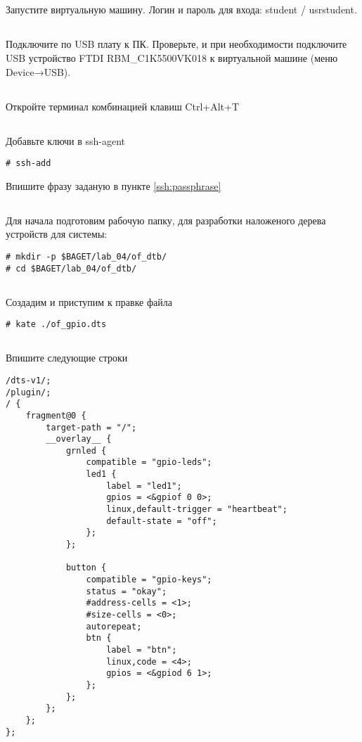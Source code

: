 \subsection{}Запустите виртуальную машину. Логин и пароль для входа: student / usrstudent.

\subsection{}Подключите по USB плату к ПК. Проверьте, и при необходимости подключите USB устройство FTDI RBM\_C1K5500VK018 к виртуальной машине (меню Device→USB).

\subsection{}Откройте терминал комбинацией клавиш Ctrl+Alt+T

\subsection{}Добавьте ключи в ssh-agent
\begin{lstlisting}[style=bash]
	# ssh-add
\end{lstlisting}
Впишите фразу заданую в пункте \ref{ssh:passphrase}

\subsection{}Для начала подготовим рабочую папку, для разработки наложеного дерева устройств для системы: 
\begin{lstlisting}[style=bash]
# mkdir -p $BAGET/lab_04/of_dtb/
# cd $BAGET/lab_04/of_dtb/
\end{lstlisting}

\subsection{}Создадим и приступим к правке файла 
\begin{lstlisting}[style=bash]
# kate ./of_gpio.dts
\end{lstlisting}

\subsection{}Впишите следующие строки
\begin{lstlisting}[style=stdout]
/dts-v1/;
/plugin/;
/ {
	fragment@0 {
		target-path = "/";
		__overlay__ {
			grnled {
				compatible = "gpio-leds";
				led1 {
					label = "led1";
					gpios = <&gpiof 0 0>;
					linux,default-trigger = "heartbeat";
					default-state = "off";
				};
			};
			
			button {
				compatible = "gpio-keys";
				status = "okay";
				#address-cells = <1>;
				#size-cells = <0>;
				autorepeat;
				btn {
					label = "btn";
					linux,code = <4>;
					gpios = <&gpiod 6 1>;
				};
			};
		};
	};
};
\end{lstlisting}

